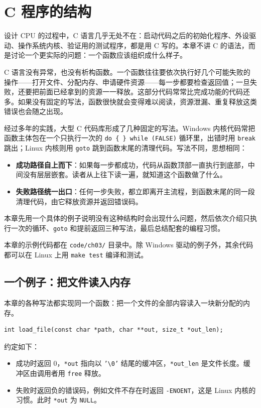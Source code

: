 \chapter{C 程序的结构}
\label{chap:c-structure}

设计 CPU 的过程中，C 语言几乎无处不在：启动代码之后的初始化程序、外设驱动、操作系统内核、验证用的测试程序，都是用 C 写的。本章不讲 C 的语法，而是讨论一个更实际的问题：一个函数应该组织成什么样子。

C 语言没有异常，也没有析构函数。一个函数往往要依次执行好几个可能失败的操作——打开文件、分配内存、申请硬件资源——每一步都要检查返回值；一旦失败，还要把前面已经拿到的资源一一释放。这部分代码常常比完成功能的代码还多。如果没有固定的写法，函数很快就会变得难以阅读，资源泄漏、重复释放这类错误也会随之出现。

经过多年的实践，大型 C 代码库形成了几种固定的写法。Windows 内核代码常把函数主体包在一个只执行一次的 \texttt{do \{ \} while (FALSE)} 循环里，出错时用 \texttt{break} 跳出；Linux 内核则用 \texttt{goto} 跳到函数末尾的清理代码。写法不同，思想相同：
\begin{itemize}
  \item \textbf{成功路径自上而下}：如果每一步都成功，代码从函数顶部一直执行到底部，中间没有层层嵌套。读者从上往下读一遍，就知道这个函数做了什么。
  \item \textbf{失败路径统一出口}：任何一步失败，都立即离开主流程，到函数末尾的同一段清理代码，由它释放资源并返回错误码。
\end{itemize}

本章先用一个具体的例子说明没有这种结构时会出现什么问题，然后依次介绍只执行一次的循环、\texttt{goto} 和提前返回三种写法，最后总结配套的编程习惯。

本章的示例代码都在 \texttt{code/ch03/} 目录中。除 Windows 驱动的例子外，其余代码都可以在 Linux 上用 \texttt{make test} 编译和测试。

\section{一个例子：把文件读入内存}
\label{sec:load-file}

本章的各种写法都实现同一个函数：把一个文件的全部内容读入一块新分配的内存。
\begin{verbatim}
int load_file(const char *path, char **out, size_t *out_len);
\end{verbatim}
约定如下：
\begin{itemize}
  \item 成功时返回 0，\texttt{*out} 指向以 \texttt{'\textbackslash 0'} 结尾的缓冲区，\texttt{*out\_len} 是文件长度。缓冲区由调用者用 \texttt{free} 释放。
  \item 失败时返回负的错误码，例如文件不存在时返回 \texttt{-ENOENT}，这是 Linux 内核的习惯。此时 \texttt{*out} 为 \texttt{NULL}。
\end{itemize}

